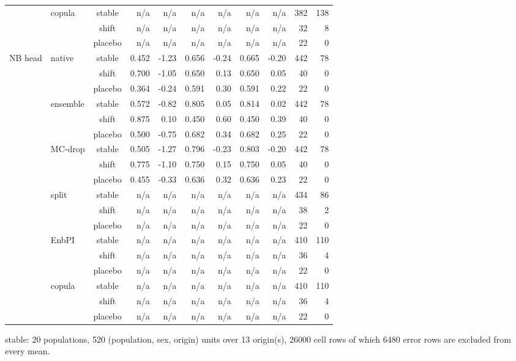 {\begin{longtable}{@{}llcrrrrrrrr@{}}
 & copula & stable & n/a & n/a & n/a & n/a & n/a & n/a & 382 & 138 \\
 &  & shift & n/a & n/a & n/a & n/a & n/a & n/a & 32 & 8 \\
 &  & placebo & n/a & n/a & n/a & n/a & n/a & n/a & 22 & 0 \\
\addlinespace[2pt]
NB head & native & stable & 0.452 & -1.23 & 0.656 & -0.24 & 0.665 & -0.20 & 442 & 78 \\
 &  & shift & 0.700 & -1.05 & 0.650 & 0.13 & 0.650 & 0.05 & 40 & 0 \\
 &  & placebo & 0.364 & -0.24 & 0.591 & 0.30 & 0.591 & 0.22 & 22 & 0 \\
 & ensemble & stable & 0.572 & -0.82 & 0.805 & 0.05 & 0.814 & 0.02 & 442 & 78 \\
 &  & shift & 0.875 & 0.10 & 0.450 & 0.60 & 0.450 & 0.39 & 40 & 0 \\
 &  & placebo & 0.500 & -0.75 & 0.682 & 0.34 & 0.682 & 0.25 & 22 & 0 \\
 & MC-drop & stable & 0.505 & -1.27 & 0.796 & -0.23 & 0.803 & -0.20 & 442 & 78 \\
 &  & shift & 0.775 & -1.10 & 0.750 & 0.15 & 0.750 & 0.05 & 40 & 0 \\
 &  & placebo & 0.455 & -0.33 & 0.636 & 0.32 & 0.636 & 0.23 & 22 & 0 \\
 & split & stable & n/a & n/a & n/a & n/a & n/a & n/a & 434 & 86 \\
 &  & shift & n/a & n/a & n/a & n/a & n/a & n/a & 38 & 2 \\
 &  & placebo & n/a & n/a & n/a & n/a & n/a & n/a & 22 & 0 \\
 & EnbPI & stable & n/a & n/a & n/a & n/a & n/a & n/a & 410 & 110 \\
 &  & shift & n/a & n/a & n/a & n/a & n/a & n/a & 36 & 4 \\
 &  & placebo & n/a & n/a & n/a & n/a & n/a & n/a & 22 & 0 \\
 & copula & stable & n/a & n/a & n/a & n/a & n/a & n/a & 410 & 110 \\
 &  & shift & n/a & n/a & n/a & n/a & n/a & n/a & 36 & 4 \\
 &  & placebo & n/a & n/a & n/a & n/a & n/a & n/a & 22 & 0 \\
\end{longtable}
\noindent\begin{minipage}{\linewidth}\scriptsize\raggedright
\noindent stable: 20 populations, 520 (population, sex, origin) units over 13 origin(s), 26000 cell rows of which 6480 error rows are excluded from every mean.\par

\end{minipage}}
